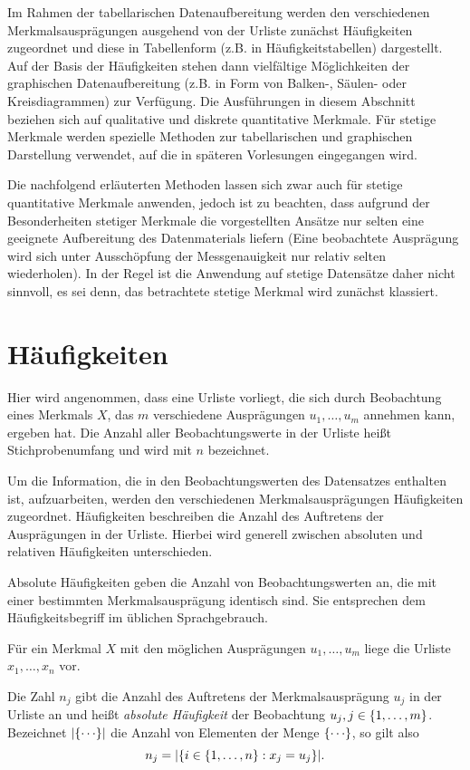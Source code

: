 \documentclass{lecture}
\begin{document}
    Im Rahmen der tabellarischen Datenaufbereitung werden den verschiedenen Merkmalsausprägungen ausgehend von der Urliste zunächst Häufigkeiten zugeordnet und diese in Tabellenform (z.B. in Häufigkeitstabellen) dargestellt.
    Auf der Basis der Häufigkeiten stehen dann vielfältige Möglichkeiten der graphischen Datenaufbereitung (z.B. in Form von Balken-, Säulen- oder Kreisdiagrammen) zur Verfügung.
    Die Ausführungen in diesem Abschnitt beziehen sich auf qualitative und diskrete quantitative Merkmale.
    Für stetige Merkmale werden spezielle Methoden zur tabellarischen und graphischen Darstellung verwendet, auf die in späteren Vorlesungen eingegangen wird.
    
    Die nachfolgend erläuterten Methoden lassen sich zwar auch für stetige quantitative Merkmale anwenden, jedoch ist zu beachten, dass aufgrund der Besonderheiten stetiger Merkmale die vorgestellten Ansätze nur selten eine geeignete Aufbereitung des Datenmaterials liefern (Eine beobachtete Ausprägung wird sich unter Ausschöpfung der Messgenauigkeit nur relativ selten wiederholen).
    In der Regel ist die Anwendung auf stetige Datensätze daher nicht sinnvoll, es sei denn, das betrachtete stetige Merkmal wird zunächst klassiert.


    \section*{Häufigkeiten}

    Hier wird angenommen, dass eine Urliste vorliegt, die sich durch Beobachtung eines Merkmals \(X\), das \(m\) verschiedene Ausprägungen \(u_1, \ldots, u_m\) annehmen kann, ergeben hat.
    Die Anzahl aller Beobachtungswerte in der Urliste heißt Stichprobenumfang und wird mit \(n\) bezeichnet.

    Um die Information, die in den Beobachtungswerten des Datensatzes enthalten ist, aufzuarbeiten, werden den verschiedenen Merkmalsausprägungen Häufigkeiten zugeordnet.
    Häufigkeiten beschreiben die Anzahl des Auftretens der Ausprägungen in der Urliste.
    Hierbei wird generell zwischen absoluten und relativen Häufigkeiten unterschieden.

    Absolute Häufigkeiten geben die Anzahl von Beobachtungswerten an, die mit einer bestimmten Merkmalsausprägung identisch sind.
    Sie entsprechen dem Häufigkeitsbegriff im üblichen Sprachgebrauch.

    \begin{definition}
        Für ein Merkmal \(X\) mit den möglichen Ausprägungen \(u_1, \ldots, u_m\) liege die Urliste \(x_1, \ldots, x_n\) vor.

        Die Zahl \(n_j\) gibt die Anzahl des Auftretens der Merkmalsausprägung \(u_j\) in der Urliste an und heißt \emph{absolute Häufigkeit} der Beobachtung \(u_j, j \in \braces*{1, \ldots, m}\).
        Bezeichnet \(\absolute*{\braces*{\cdots}}\) die Anzahl von Elementen der Menge \(\braces*{\cdots}\), so gilt also
        \[
            n_j = \absolute*{\braces*{i \in \braces*{1, \ldots, n} : x_j = u_j}}.
        \]
    \end{definition}
\end{document}
